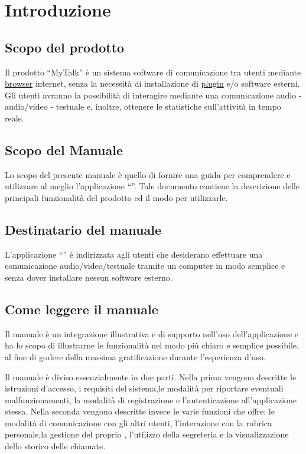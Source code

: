 


\setcounter{page}{1}
\pagestyle{normal}

\section{Introduzione}
\subsection{Scopo del prodotto}
Il prodotto ``MyTalk'' è un sistema software di comunicazione tra utenti mediante \underline{browser} internet, senza la necessità di installazione di \underline{plugin} e/o software esterni. Gli utenti avranno la possibilità di interagire mediante una comunicazione audio - audio/video - testuale e, inoltre, ottenere le statistiche sull'attività in tempo reale.

\subsection{Scopo del Manuale}
Lo scopo del presente manuale è quello di fornire una guida per comprendere e utilizzare al meglio l'applicazione ``\caName''.
Tale documento contiene la descrizione delle principali funzionalità del prodotto ed il modo
per utilizzarle.

\subsection{Destinatario del manuale}
L'applicazione  ``\caName'' è indirizzata agli utenti che desiderano effettuare una comunicazione audio/video/testuale tramite un computer in modo semplice  e senza dover installare nessun software esterno.  

\subsection{Come leggere il manuale}
Il manuale è un integrazione illustrativa e di supporto nell'uso dell'applicazione \caName e ha lo scopo di illustrarne le funzionalità nel modo più chiaro e semplice possibile, al fine di godere della massima gratificazione durante l'esperienza d'uso.

Il manuale è diviso essenzialmente in due parti.
Nella prima vengono descritte le istruzioni d'accesso, i requisiti del sistema,le modalità per riportare eventuali malfunzionamenti, la modalità di registrazione e l'autenticazione all'applicazione stessa. 
Nella seconda vengono descritte invece le varie funzioni che \caName offre: le modalità di comunicazione con gli altri utenti, l'interazione con la rubrica personale,la gestione del proprio \underline{}, l'utilizzo della segreteria e la visualizzazione dello storico delle chiamate.

